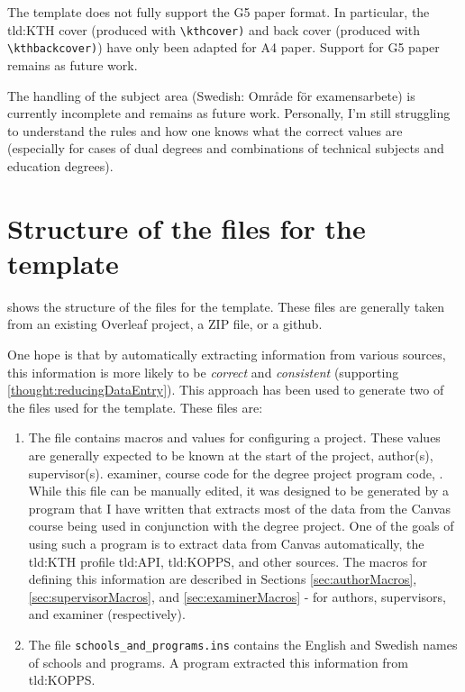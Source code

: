 The template does not fully support the G5 paper format. In particular, the \gls{tld:KTH} cover (produced with \texttt{\textbackslash kthcover)} and back cover (produced with \texttt{\textbackslash kthbackcover)}) have only been adapted for A4 paper. Support for G5 paper remains as future work.

The handling of the subject area (Swedish: \foreignlanguage{swedish}{Område för examensarbete}) is currently incomplete and remains as future work. Personally, I'm still struggling to understand the rules and how one knows what the correct values are (especially for cases of \first dual degrees and \Second combinations of technical subjects and education degrees).

\section{Structure of the files for the template}
 shows the structure of the files for the template. These files are generally taken from an existing Overleaf project, a ZIP file, or a github.

One hope is that by automatically extracting information from various sources, this information is more likely to be \textit{correct} and \textit{consistent} (supporting \ref{thought:reducingDataEntry}). This approach has been used to generate two of the files used for the template. These files are:
\begin{enumerate}
    \item The file  contains macros and values for configuring a project. These values are generally expected to be known at the start of the project, \eg author(s), supervisor(s). examiner, course code for the degree project program code, \etc. While this file can be manually edited, it was designed to be generated by a program that I have written that extracts most of the data from the Canvas course being used in conjunction with the degree project. One of the goals of using such a program is to extract data from Canvas automatically, the \gls{tld:KTH} profile \gls{tld:API}, \gls{tld:KOPPS}, and other sources. The macros for defining this information are described in Sections \ref{sec:authorMacros}, \ref{sec:supervisorMacros}, and \ref{sec:examinerMacros} - for authors, supervisors, and examiner (respectively).

    \item The file \texttt{schools\_and\_programs.ins} contains the English and Swedish names of schools and programs. A program extracted this information from \gls{tld:KOPPS}.
\end{enumerate}

